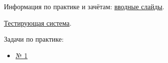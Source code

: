\documentclass[12pt,a4paper]{article}
\begin{document}
    Информация по практике и зачётам: \href{http://acm.math.spbu.ru/~gassa/bachelor-2020/200907_m10_slides.ru.pdf}{вводные слайды}.

    \href{http://acm.math.spbu.ru/tsweb}{Тестирующая система}.

    \vspace{1em} Задачи по практике:
    \begin{itemize}
        \item \href{http://acm.math.spbu.ru/~gassa/bachelor-2020/200907_m20.pdf}{№ 1}
    \end{itemize}
\end{document}
